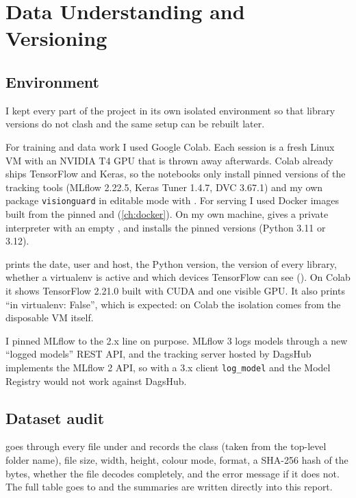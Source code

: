 \chapter{Data Understanding and Versioning}\label{ch:data}

\section{Environment}
I kept every part of the project in its own isolated environment so that library versions do not
clash and the same setup can be rebuilt later.

For training and data work I used Google Colab. Each session is a fresh Linux VM with an NVIDIA T4
GPU that is thrown away afterwards. Colab already ships TensorFlow and Keras, so the notebooks only
install pinned versions of the tracking tools (MLflow 2.22.5, Keras Tuner 1.4.7, DVC 3.67.1) and my
own package \texttt{visionguard} in editable mode with . For serving I used
Docker images built from the pinned  and 
(\cref{ch:docker}). On my own machine,  gives a private interpreter with an
empty , and  installs the pinned versions
(Python 3.11 or 3.12).

 prints the date, user and host, the Python version, the version of
every library, whether a virtualenv is active and which devices TensorFlow can see
(). On Colab it shows TensorFlow 2.21.0 built with
CUDA and one visible GPU. It also prints ``in virtualenv: False'', which is expected: on Colab the
isolation comes from the disposable VM itself.


I pinned MLflow to the 2.x line on purpose. MLflow 3 logs models through a new ``logged models''
REST API, and the tracking server hosted by DagsHub implements the MLflow 2 API, so with a 3.x
client \texttt{log\_model} and the Model Registry would not work against DagsHub.

\section{Dataset audit}
 goes through every file under  and records the class
(taken from the top-level folder name), file size, width, height, colour mode, format, a SHA-256
hash of the bytes, whether the file decodes completely, and the error message if it does not. The
full table goes to  and the summaries are written directly into this
report.

